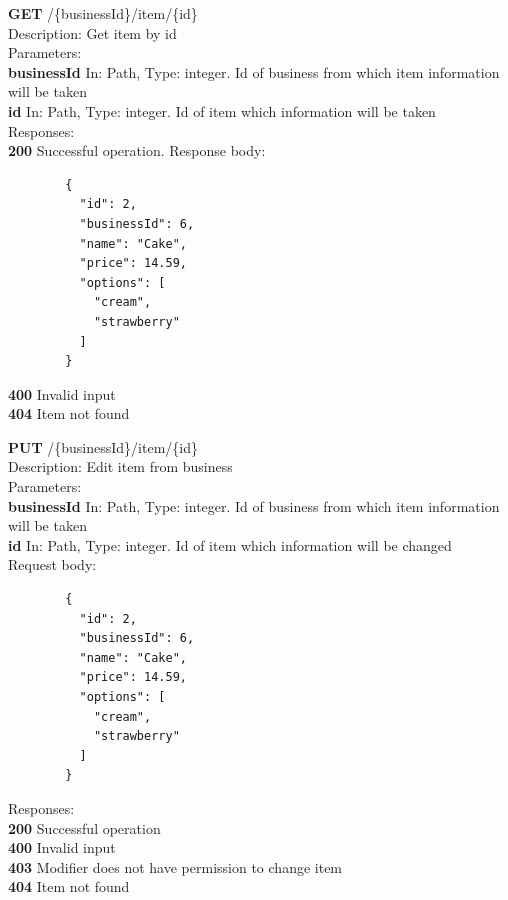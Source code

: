 \documentclass[11pt,a4paper,pdftex]{article}
\begin{document}
\hspace*{1em}\textbf{GET} /\{businessId\}/item/\{id\}\\
\hspace*{2em}Description: Get item by id\\
\hspace*{2em}Parameters:\\
\hspace*{3em}\textbf{businessId} In: Path, Type: integer. Id of business from which item information will be taken\\
\hspace*{3em}\textbf{id} In: Path, Type: integer. Id of item which information will be taken\\
\hspace*{2em}Responses:\\
\hspace*{3em}\textbf{200} Successful operation. Response body:
\begin{verbatim}
        {
          "id": 2,
          "businessId": 6,
          "name": "Cake",
          "price": 14.59,
          "options": [
            "cream",
            "strawberry"
          ]
        }
\end{verbatim}
\hspace*{3em}\textbf{400} Invalid input\\
\hspace*{3em}\textbf{404} Item not found

\hspace*{1em}\textbf{PUT} /\{businessId\}/item/\{id\}\\
\hspace*{2em}Description: Edit item from business\\
\hspace*{2em}Parameters:\\
\hspace*{3em}\textbf{businessId} In: Path, Type: integer. Id of business from which item information will be taken\\
\hspace*{3em}\textbf{id} In: Path, Type: integer. Id of item which information will be changed\\
\hspace*{2em}Request body:\\
\begin{verbatim}
        {
          "id": 2,
          "businessId": 6,
          "name": "Cake",
          "price": 14.59,
          "options": [
            "cream",
            "strawberry"
          ]
        }
\end{verbatim}
\hspace*{2em}Responses:\\
\hspace*{3em}\textbf{200} Successful operation\\
\hspace*{3em}\textbf{400} Invalid input\\
\hspace*{3em}\textbf{403} Modifier does not have permission to change item\\
\hspace*{3em}\textbf{404} Item not found
\end{document}
